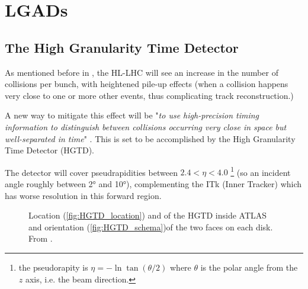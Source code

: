 \chapter{LGADs}\label{chap:LGADs}

\section{The High Granularity Time Detector}\label{sec:HGTD}

As mentioned before in , the HL-LHC will see an increase in the number of collisions per bunch, with heightened pile-up effects (when a collision happens very close to one or more other events, thus complicating track reconstruction.) 
 
A new way to mitigate this effect will be "\textit{to use high-precision timing information to distinguish between collisions occurring very close in space but well-separated in time}" \cite{CERN-LHCC-2020-007}. This is set to be accomplished by the High Granularity Time Detector (HGTD).
 
The detector will cover pseudrapidities between $2.4 < \eta < 4.0$ \footnote{the pseudorapity is $\eta=-\ln \tan(\theta/2)$ where $\theta$ is the polar angle from the $z$ axis, i.e. the beam direction.} (so an incident angle roughly between 2° and 10°), complementing the ITk (Inner Tracker) which has worse resolution in this forward region. %
\begin{figure}[!ht]
    \centering
    \hfill
    \centering
    \caption{Location (\ref{fig:HGTD_location}) and of the HGTD inside ATLAS and orientation (\ref{fig:HGTD_schema})of the two faces on each disk. From \cite{cernTechnicalDesign}.}
\end{figure}

